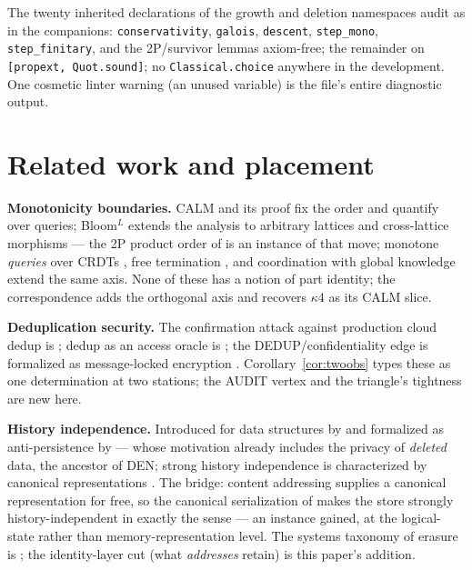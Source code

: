 \documentclass[10pt]{article}
\begin{document}
\noindent The twenty inherited declarations of the growth and deletion namespaces audit as in the companions: \texttt{conservativity}, \texttt{galois}, \texttt{descent}, \texttt{step\_mono}, \texttt{step\_finitary}, and the 2P/survivor lemmas axiom-free; the remainder on \texttt{[propext, Quot.sound]}; no \texttt{Classical.choice} anywhere in the development. One cosmetic linter warning (an unused variable) is the file's entire diagnostic output.

\section{Related work and placement}\label{sec:related}

\textbf{Monotonicity boundaries.} CALM and its proof \cite{Hellerstein10,AmelootNV13} fix the order and quantify over queries; Bloom$^L$ \cite{Conway12} extends the analysis to arbitrary lattices and cross-lattice morphisms --- the 2P product order of \cite{deletion} is an instance of that move; monotone \emph{queries} over CRDTs \cite{Laddad22}, free termination \cite{Power25}, and coordination with global knowledge \cite{BaccaertKetsman23} extend the same axis. None of these has a notion of part identity; the correspondence adds the orthogonal axis and recovers $\kappa$4 as its CALM slice.

\textbf{Deduplication security.} The confirmation attack against production cloud dedup is \cite{Harnik10}; dedup as an access oracle is \cite{Halevi11}; the DEDUP/confidentiality edge is formalized as message-locked encryption \cite{Douceur02,BKR13mle,Bellare13}. Corollary~\ref{cor:twoobs} types these as one determination at two stations; the AUDIT vertex and the triangle's tightness are new here.

\textbf{History independence.} Introduced for data structures by \cite{Micciancio97} and formalized as anti-persistence by \cite{NaorTeague01} --- whose motivation already includes the privacy of \emph{deleted} data, the ancestor of DEN; strong history independence is characterized by canonical representations \cite{Hartline02}. The bridge: content addressing supplies a canonical representation for free, so the canonical serialization of \cite{growth} makes the store strongly history-independent in exactly the \cite{Hartline02} sense --- an instance gained, at the logical-state rather than memory-representation level. The systems taxonomy of erasure is \cite{Reardon13}; the identity-layer cut (what \emph{addresses} retain) is this paper's addition.
\end{document}
